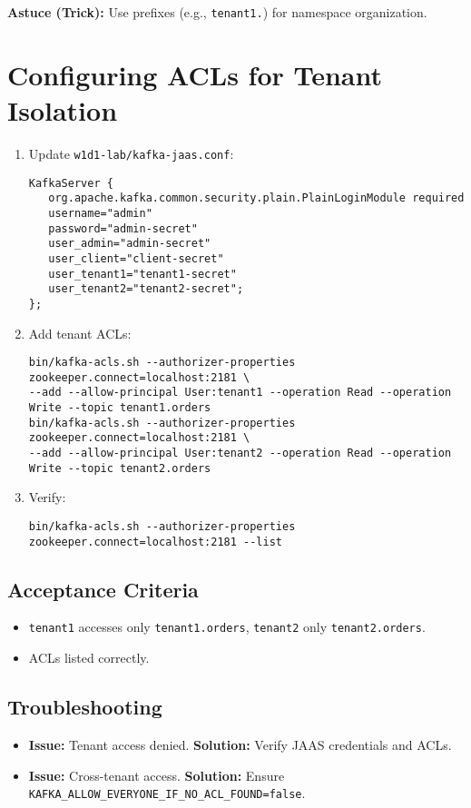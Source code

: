 \documentclass[12pt,a4paper]{report}
\begin{document}
\begin{framed}
\textbf{Astuce (Trick):} Use prefixes (e.g., \texttt{tenant1.}) for namespace organization.
\end{framed}

\section{Configuring ACLs for Tenant Isolation}
\begin{enumerate}
    \item Update \texttt{w1d1-lab/kafka-jaas.conf}:
\begin{lstlisting}
KafkaServer {
   org.apache.kafka.common.security.plain.PlainLoginModule required
   username="admin"
   password="admin-secret"
   user_admin="admin-secret"
   user_client="client-secret"
   user_tenant1="tenant1-secret"
   user_tenant2="tenant2-secret";
};
\end{lstlisting}
    \item Add tenant ACLs:
    \begin{lstlisting}
bin/kafka-acls.sh --authorizer-properties zookeeper.connect=localhost:2181 \
--add --allow-principal User:tenant1 --operation Read --operation Write --topic tenant1.orders
bin/kafka-acls.sh --authorizer-properties zookeeper.connect=localhost:2181 \
--add --allow-principal User:tenant2 --operation Read --operation Write --topic tenant2.orders
    \end{lstlisting}
    \item Verify:
    \begin{lstlisting}
bin/kafka-acls.sh --authorizer-properties zookeeper.connect=localhost:2181 --list
    \end{lstlisting}
\end{enumerate}

\subsection{Acceptance Criteria}
\begin{itemize}
    \item \texttt{tenant1} accesses only \texttt{tenant1.orders}, \texttt{tenant2} only \texttt{tenant2.orders}.
    \item ACLs listed correctly.
\end{itemize}

\subsection{Troubleshooting}
\begin{itemize}
    \item \textbf{Issue:} Tenant access denied.
      \textbf{Solution:} Verify JAAS credentials and ACLs.
    \item \textbf{Issue:} Cross-tenant access.
      \textbf{Solution:} Ensure \texttt{KAFKA_ALLOW_EVERYONE_IF_NO_ACL_FOUND=false}.
\end{itemize}
\end{document}
